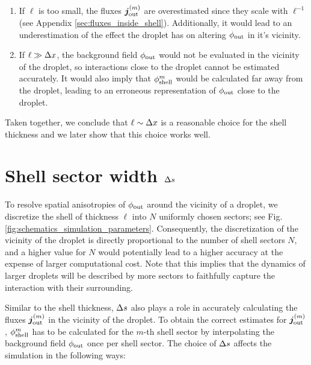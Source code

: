 \begin{enumerate}

    \item If $\ell$ is too small, the fluxes $\boldsymbol{j}_\mathrm{out}^{(m)}$ are overestimated since they scale with $\ell^{-1}$ (see Appendix \ref{sec:fluxes_inside_shell}).
    Additionally, it would lead to an underestimation of the effect the droplet has on altering $\phi_\mathrm{out}$ in it's vicinity. 
    
    \item If $\ell \gg \Delta x$, the background field $\phi_\mathrm{out}$ would not be evaluated in the vicinity of the droplet, so interactions close to the droplet cannot be estimated accurately.
    It would also imply that $\phi_\mathrm{shell}^{m}$ would be calculated far away from the droplet, leading to an erroneous representation of $\phi_\mathrm{out}$ close to the droplet.  
    
\end{enumerate}
Taken together, we conclude that $\ell \sim \Delta x$ is a reasonable choice for the shell thickness and we later show that this choice works well.

\section{Shell sector width $\Delta s$}

To resolve spatial anisotropies of $\phi_\mathrm{out}$ around the vicinity of a droplet, we discretize the shell of thickness $\ell$ into $N$ uniformly chosen sectors; see Fig. \ref{fig:schematics_simulation_parameters}.
Consequently, the discretization of the vicinity of the droplet is directly proportional to the number of shell sectors $N$, and a higher value for $N$  would potentially lead to a higher accuracy at the expense of larger computational cost.
Note that this implies that the dynamics of larger droplets will be described by more sectors to faithfully capture the interaction with their surrounding.

Similar to the shell thickness, $\Delta s$ also plays a role in accurately calculating the fluxes $\boldsymbol{j}_\mathrm{out}^{(m)}$ in the vicinity of the droplet.
To obtain the correct estimates for $\boldsymbol{j}_\mathrm{out}^{(m)}$, $\phi_\mathrm{shell}^{m}$ has to be calculated for the $m$-th shell sector by interpolating the background field $\phi_\mathrm{out}$ once per shell sector.
The choice of $\Delta s$ affects the simulation in the following ways:

